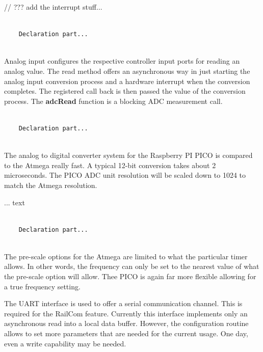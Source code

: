 // ??? add the interrupt stuff...

\lstset{language=c++, style=codesnippetstyle}
\begin{lstlisting}
   
    Declaration part...
    
\end{lstlisting}
\FloatBarrier


Analog input configures the respective controller input ports for reading an analog value. The read method offers an asynchronous way in just starting the analog input conversion process and a hardware interrupt when the conversion completes. The registered call back is then passed the value of the conversion process. The \textbf{adcRead} function is a blocking ADC measurement call.

\lstset{language=c++, style=codesnippetstyle}
\begin{lstlisting}
   
    Declaration part...
    
\end{lstlisting}
\FloatBarrier

The analog to digital converter system for the Raspberry PI PICO is compared to the Atmega really fast. A typical 12-bit conversion takes about 2 microseconds. The PICO ADC unit resolution will be scaled down to 1024 to match the Atmega resolution.


... text

\lstset{language=c++, style=codesnippetstyle}
\begin{lstlisting}
   
    Declaration part...
    
\end{lstlisting}
\FloatBarrier

The pre-scale options for the Atmega are limited to what the particular timer allows. In other words, the frequency can only be set to the nearest value of what the pre-scale option will allow. Thee PICO is again far more flexible allowing for a true frequency setting.


The UART interface is used to offer a serial communication channel. This is required for the RailCom feature. Currently this interface implements only an asynchronous read into a local data buffer. However, the configuration routine allows to set more parameters that are needed for the current usage. One day, even a write capability may be needed.

